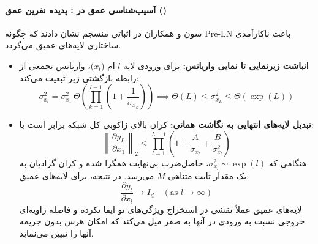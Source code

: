 \paragraph*{آسیب‌شناسی عمق در : پدیده نفرین عمق () \cite{sun2025curse}}
سون و همکاران در اثباتی منسجم نشان دادند که چگونه Pre-LN باعث ناکارآمدی ساختاری لایه‌های عمیق می‌گردد.
\begin{itemize}
    \item \textbf{انباشت زیرنمایی تا نمایی واریانس:} برای ورودی لایه $l$-ام ($x_l$)، واریانس تجمعی از رابطه بازگشتی زیر تبعیت می‌کند:
    \begin{equation}
        \sigma_{x_l}^2 = \sigma_{x_1}^2 \, \Theta\left( \prod_{k=1}^{l-1} \left(1 + \frac{1}{\sigma_{x_k}}\right) \right) \implies \Theta(L) \le \sigma_{x_L}^2 \le \Theta(\exp(L))
    \end{equation}
    \item \textbf{تبدیل لایه‌های انتهایی به نگاشت همانی:} کران بالای ژاکوبی کل شبکه برابر است با:
    \begin{equation}
        \left\| \frac{\partial y_L}{\partial x_1} \right\|_2 \le \prod_{l=1}^{L-1} \left( 1 + \frac{A}{\sigma_{x_l}} + \frac{B}{\sigma_{x_l}^2} \right)
    \end{equation}
    هنگامی که $\sigma_{x_l}^2 \sim \exp(l)$، حاصل‌ضرب بی‌نهایت همگرا شده و کران گرادیان به یک مقدار ثابت متناهی $M$ می‌رسد. در نتیجه، برای لایه‌های عمیق:
    \begin{equation}
        \frac{\partial y_l}{\partial x_l} \to I_d \quad (\text{as } l \to \infty)
    \end{equation}
    لایه‌های عمیق عملاً نقشی در استخراج ویژگی‌های نو ایفا نکرده و فاصله زاویه‌ای خروجی نسبت به ورودی در آنها به صفر میل می‌کند که امکان هرس بدون جریمه آنها را تبیین می‌نماید.
\end{itemize}

